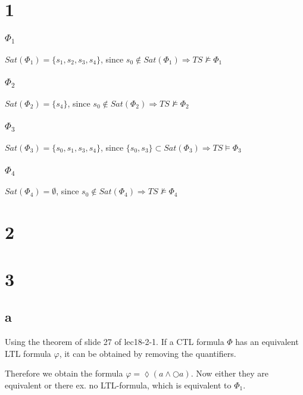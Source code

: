 \documentclass[11pt]{article}
\begin{document}
	
\section{1}
\subsubsection*{$\Phi_1$}
$Sat(\Phi_1) = \{s_1,s_2,s_3,s_4\}$, since $s_0 \notin Sat(\Phi_1) \Rightarrow TS\not\models \Phi_1$
\subsubsection*{$\Phi_2$}
$Sat(\Phi_2) = \{s_4\}$, since $s_0 \notin Sat(\Phi_2) \Rightarrow TS\not\models \Phi_2$
\subsubsection*{$\Phi_3$}
$Sat(\Phi_3) = \{s_0,s_1,s_3,s_4\}$, since $\{s_0, s_3\} \subset Sat(\Phi_3) \Rightarrow TS \models \Phi_3$
\subsubsection*{$\Phi_4$}
$Sat(\Phi_4) = \emptyset$, since $s_0 \notin Sat(\Phi_4) \Rightarrow TS\not\models \Phi_4$


\section{2}

\section{3}
\subsection{a}

Using the theorem of slide 27 of lec18-2-1. If a CTL formula $\Phi$ has an equivalent LTL formula $\varphi$, it can be obtained by removing the quantifiers.

Therefore we obtain the formula $\varphi = \lozenge(a \land \bigcirc a)$. Now either they are equivalent or there ex. no LTL-formula, which is equivalent to $\Phi_1$.
\end{document}
